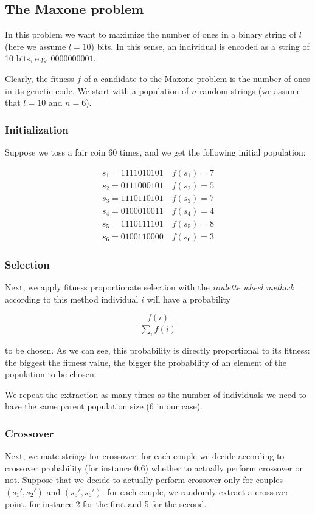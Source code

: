 \subsection{The Maxone problem}
In this problem we want to maximize the number of ones in a binary string of $l$ (here we assume $l = 10$) bits. In this sense, an individual is encoded as a string of 10 bits, e.g. $0000000001$.

Clearly, the fitness $f$ of a candidate to the Maxone problem is the number of ones in its genetic code. We start with a population of $n$ random strings (we assume that $l = 10$ and $n = 6$). 

\subsubsection{Initialization}
Suppose we toss a fair coin 60 times, and we get the following initial population:

\begin{align*}
    s_1 = 1111010101 \quad f(s_1) = 7 \\
s_2 = 0111000101 \quad f(s_2) = 5 \\
s_3 = 1110110101 \quad f(s_3) = 7 \\
s_4 = 0100010011 \quad f(s_4) = 4 \\
s_5 = 1110111101 \quad f(s_5) = 8 \\
s_6 = 0100110000 \quad f(s_6) = 3
\end{align*}

\subsubsection{Selection}
Next, we apply fitness proportionate selection with the \textit{roulette wheel method}: according to this method individual $i$ will have a probability 

$$
\frac{f(i)}{\sum_i f(i)}
$$

to be chosen. As we can see, this probability is directly proportional to its fitness: the biggest the fitness value, the bigger the probability of an element of the population to be chosen.

We repeat the extraction as many times as the number of individuals we need to have the same parent population size (6 in our case).

\subsubsection{Crossover}
Next, we mate strings for crossover: for each couple we decide according to crossover probability (for instance 0.6) whether to actually perform crossover or not. Suppose that we decide to actually perform crossover only for couples $(s_1', s_2')$ and $(s_5', s_6')$: for each couple, we randomly extract a crossover point, for instance 2 for the first and 5 for the second.

